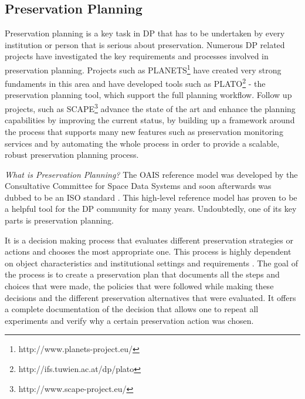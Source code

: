 \subsection{Preservation Planning}
Preservation planning is a key task in DP that has to be undertaken by every institution or person that is serious about preservation. Numerous DP related projects have investigated the key requirements and processes involved in preservation planning. Projects such as PLANETS\footnote{http://www.planets-project.eu/} have created very strong fundaments in this area and have developed tools such as PLATO\footnote{http://ifs.tuwien.ac.at/dp/plato} - the preservation planning tool, which support the full planning workflow. Follow up projects, such as SCAPE\footnote{http://www.scape-project.eu/} advance the state of the art and enhance the planning capabilities by improving the current status, by building up a framework around the process that supports many new features such as preservation monitoring services and by automating the whole process in order to provide a scalable, robust preservation planning process.\newline

\noindent\textit{What is Preservation Planning?}\newline
The OAIS reference model was developed by the Consultative Committee for Space Data Systems and soon afterwards was dubbed to be an ISO standard \cite{iso:2003:oais}. This high-level reference model has proven to be a helpful tool for the DP community for many years. Undoubtedly, one of its key parts is preservation planning.

It is a decision making process that evaluates different preservation strategies or actions and chooses the most appropriate one. This process is highly dependent on object characteristics and institutional settings and requirements \cite{STR07_jcdl}. The goal of the process is to create a preservation plan that documents all the steps and choices that were made, the policies that were followed while making these decisions and the different preservation alternatives that were evaluated. It offers a complete documentation of the decision that allows one to repeat all experiments and verify why a certain preservation action was chosen.

